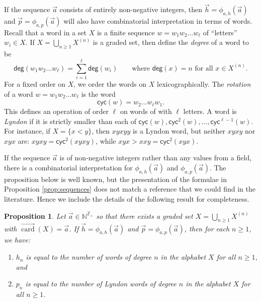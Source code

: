\documentclass[11pt]{amsart}
\newtheorem{proposition}[theorem]{Proposition}
\theoremstyle{definition}
\numberwithin{equation}{section}
\def\NN{{\mathbb N}}
\def\ZZ{{\mathbb Z}}
\def\QQ{{\mathbb Q}}
\newcommand{\veccard}{\overrightarrow{\operatorname{card}}}
\begin{document}
If the sequence $\vec{a}$ consists of entirely non-negative integers,
then $\vec{h} = \phi_{a, h}(\vec{a})$ and $\vec{p} = \phi_{a, p}(\vec{a})$ will also have combinatorial interpretation in terms of words.
Recall that a word in a set $X$ is a finite sequence $w = w_{1} w_{2} \ldots w_{\ell}$ of ``letters'' $w_{i} \in X$.  
If $X = \bigcup_{n \geq 1} X^{(n)}$ is a graded set, then define the \emph{degree} of a word to be
\[
\mathsf{deg}(w_1 w_2 \ldots w_{\ell}) = \sum_{i = 1}^{\ell} \mathsf{deg}(w_{i})
\qquad\text{where $\mathsf{deg}(x) = n$ for all $x \in X^{(n)}$}.
\]
For a fixed order on $X$, we order the words on $X$ lexicographically.  
The \emph{rotation} of a word $w = w_{1} w_{2} \ldots w_{\ell}$ is the word
\[
\mathsf{cyc}(w) =  w_{2} \ldots w_{\ell} w_{1}.
\]
This defines an operation of order $\ell$ on words of with $\ell$ letters.  
A word is \emph{Lyndon} if it is strictly smaller than each of $\mathsf{cyc}(w), \mathsf{cyc}^{2}(w), \ldots, \mathsf{cyc}^{\ell-1}(w)$.  
For instance, if $X = \{x < y\}$, then $xyxyy$ is a Lyndon word, but neither $xyxy$ nor $xyx$ are: $xyxy = \mathsf{cyc}^{2}(xyxy)$, while $xyx > xxy = \mathsf{cyc}^{2}(xyx)$.

If the sequence $\vec{a}$ is of non-negative integers rather than
any values from a field, there is a combinatorial interpretation for
$\phi_{a, h}(\vec{a})$ and $\phi_{a, p}(\vec{a})$.
The proposition below is well known, but the presentation of the
formulae in Proposition \ref{prop:sequences} does not match a reference that
we could find in the literature.  Hence we include the details of the
following result for completeness.

\begin{proposition}
\label{prop:combinatorialinterpretation}
Let $\vec{a} \in \NN^{\ZZ_+}$ so that there exists a graded set $X = \bigcup_{n \geq 1} X^{(n)}$ with $\veccard(X) = \vec{a}$.
If $\vec{h} = \phi_{a, h}(\vec{a})$ and $\vec{p} = \phi_{a, p}(\vec{a})$, then for each $n \geq 1$, we have:
\begin{enumerate}[itemsep = 0.5em]
\item $h_n$ is equal to the number of words of degree $n$ in the alphabet $X$ for all $n \ge 1$, and 

\item $p_n$ is equal to the number of Lyndon words of degree $n$ in the alphabet $X$ for all $n \ge 1$.
\end{enumerate}
\end{proposition}
\end{document}
